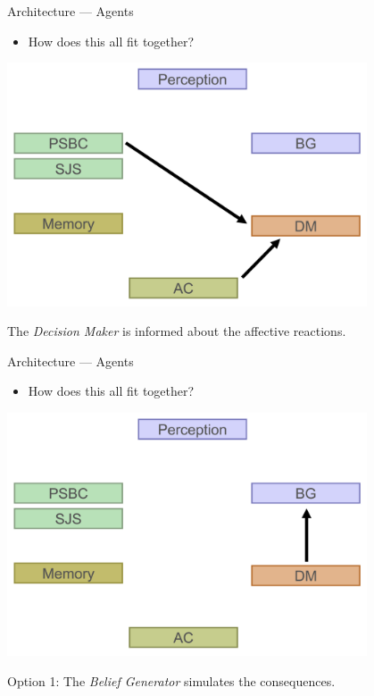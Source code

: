 \documentclass{beamer}
\begin{document}
   \begin{frame}{Architecture --- Agents}
      \begin{itemize}
         \item {How does this all fit together?}
      \end{itemize}
      
      \begin{center}
         \includegraphics[width=0.8\textwidth]{plan_2.png}
      \end{center}
      
      The \emph{Decision Maker} is informed about the affective reactions.
   \end{frame}
   
   \begin{frame}{Architecture --- Agents}
      \begin{itemize}
         \item {How does this all fit together?}
      \end{itemize}
      
      \begin{center}
         \includegraphics[width=0.8\textwidth]{plan_3.png}
      \end{center}
      
      Option 1: The \emph{Belief Generator} simulates the consequences.
   \end{frame}
   
\end{document}
